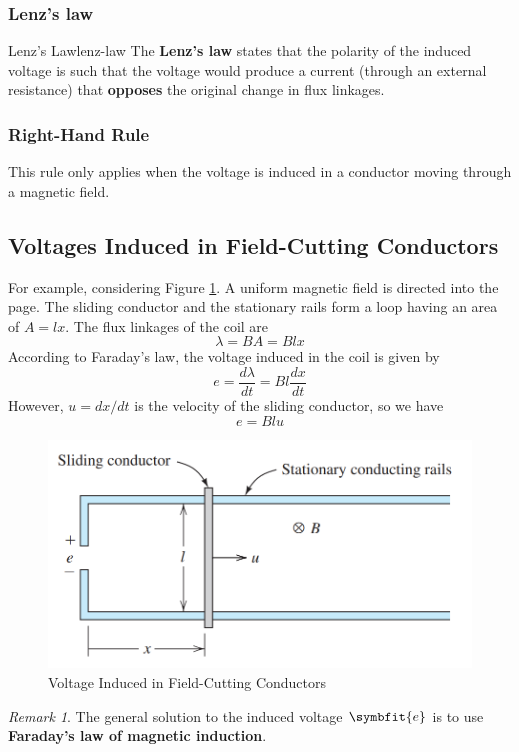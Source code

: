 \documentclass[math,code]{amznotes}
\theoremstyle{remark}
\newtheorem*{remark}{Remark}
\begin{document}
\subsubsection{Lenz's law}
\begin{thmbox}{Lenz's Law}{lenz-law}
    The \textbf{Lenz's law} states that the polarity of the induced voltage is such that the voltage would produce a current (through an external resistance) that \textbf{opposes} the original change in flux linkages.
\end{thmbox}
\subsubsection{Right-Hand Rule}
This rule only applies when the voltage is induced in a conductor moving through a magnetic field.
\subsection{Voltages Induced in Field-Cutting Conductors}
For example, considering Figure \ref{fig:voltage-induced-in-field-cutting-conductors}. A uniform magnetic field is directed into the page. The sliding conductor and the stationary rails form a loop having an area of $A=lx$. The flux linkages of the coil are
\begin{displaymath}
    \lambda = BA = Blx
\end{displaymath}
According to Faraday's law, the voltage induced in the coil is given by
\begin{displaymath}
    e=\frac{d\lambda}{dt}=Bl\frac{dx}{dt}
\end{displaymath}
However, $u=dx/dt$ is the velocity of the sliding conductor, so we have
\begin{equation}
    e=Blu
\end{equation}
\begin{figure}[H]
    \centering
    \includegraphics[width=0.5\linewidth]{images/voltage-induced-in-field-cutting-conductors.png}
    \caption{Voltage Induced in Field-Cutting Conductors}
    \label{fig:voltage-induced-in-field-cutting-conductors}
\end{figure}
\begin{notebox}
    \begin{remark}
        The general solution to the induced voltage $\symbfit{e}$ is to use {\color{red} \textbf{Faraday's law of magnetic induction}}.
    \end{remark}
\end{notebox}
\end{document}
